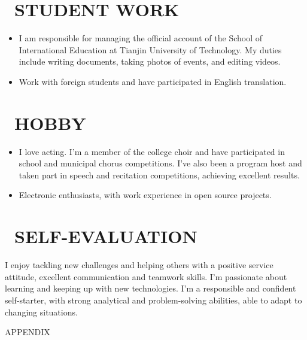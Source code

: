 \documentclass{resume}
\begin{document}
\section{\faBriefcase\ STUDENT WORK}
 
    \begin{itemize}
      \item I am responsible for managing the official account of the School of International Education at Tianjin University of Technology. My duties include writing documents, taking photos of events, and editing videos.
      \item Work with foreign students and have participated in English translation.
    \end{itemize}
     

\section{\faFlag\ HOBBY}
\begin{itemize}[parsep=0.5ex]
  \item I love acting. I'm a member of the college choir and have participated in school and municipal chorus competitions. I've also been a program host and taken part in speech and recitation competitions, achieving excellent results.
  \item Electronic enthusiasts, with work experience in open source projects.
\end{itemize}



\section{\faInfo\ SELF-EVALUATION}
\large I enjoy tackling new challenges and helping others with a positive service attitude, excellent communication and teamwork skills. I'm passionate about learning and keeping up with new technologies. I'm a responsible and confident self-starter, with strong analytical and problem-solving abilities, able to adapt to changing situations.
 
\newpage 
\begin{center}
\LARGE APPENDIX
\end{center}
\end{document}
